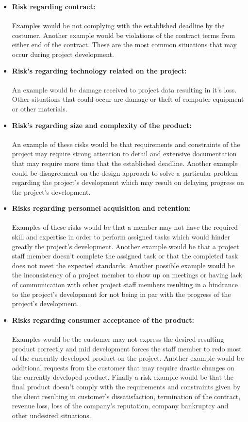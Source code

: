\documentclass[12pt]{article}
\begin{document}
\begin{itemize}
  \item \textbf{Risk regarding contract:}\\\\
  Examples would be not complying with the established deadline by the costumer. Another example would be violations of the contract terms from either end of the contract. These are the most common situations that may occur during project development.
  \item \textbf{Risk’s regarding technology related on the project:}\\\\
      An example would be damage received to project data resulting in it’s loss. Other situations that could occur are damage or theft of computer equipment or other materials.
  \item \textbf{Risk’s regarding size and complexity of the product:}\\\\
      An example of these risks would be that requirements and constraints of the project may require strong attention to detail and extensive documentation that may require more time that the established deadline. Another example could be disagreement on the design approach to solve a particular problem regarding the project’s development which may result on delaying progress on the project’s development.
  \item \textbf{Risks regarding personnel acquisition and retention:}\\\\
      Examples of these risks would be that a member may not have the required skill and expertise in order to perform assigned tasks which would hinder greatly the project’s development. Another example would be that a project staff member doesn’t complete the assigned task or that the completed task does not meet the expected standards. Another possible example would be the inconsistency of a project member to show up on meetings or having lack of communication with other project staff members resulting in a hindrance to the project’s development for not being in par with the progress of the project’s development.
  \item \textbf{Risks regarding consumer acceptance of the product:}\\\\
      Examples would be the customer may not express the desired resulting product correctly and mid development forces the staff member to redo most of the currently developed product on the project. Another example would be additional requests from the customer that may require drastic changes on the currently developed product.  Finally a risk example would be that the final product doesn’t comply with the requirements and constraints given by the client resulting in customer’s dissatisfaction, termination of the contract, revenue loss, loss of the company’s reputation, company bankruptcy and other undesired situations.
\end{itemize}
\end{document}
